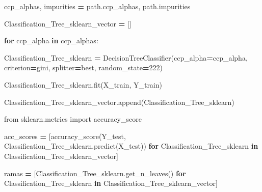 \documentclass[
  11pt,
  a4paper,
]{article}
\newenvironment{Shaded}{\begin{snugshade}}{\end{snugshade}}
\newcommand{\ControlFlowTok}[1]{\textcolor[rgb]{0.13,0.29,0.53}{\textbf{#1}}}
\newcommand{\DecValTok}[1]{\textcolor[rgb]{0.00,0.00,0.81}{#1}}
\newcommand{\ImportTok}[1]{#1}
\newcommand{\KeywordTok}[1]{\textcolor[rgb]{0.13,0.29,0.53}{\textbf{#1}}}
\newcommand{\NormalTok}[1]{#1}
\newcommand{\OperatorTok}[1]{\textcolor[rgb]{0.81,0.36,0.00}{\textbf{#1}}}
\newcommand{\StringTok}[1]{\textcolor[rgb]{0.31,0.60,0.02}{#1}}
\begin{document}
\begin{Shaded}
\begin{Highlighting}[]
\NormalTok{ccp\_alphas, impurities }\OperatorTok{=}\NormalTok{ path.ccp\_alphas, path.impurities}
\end{Highlighting}
\end{Shaded}

\begin{Shaded}
\begin{Highlighting}[]
\NormalTok{Classification\_Tree\_sklearn\_vector }\OperatorTok{=}\NormalTok{ []}

\ControlFlowTok{for}\NormalTok{ ccp\_alpha }\KeywordTok{in}\NormalTok{ ccp\_alphas:}
    
\NormalTok{    Classification\_Tree\_sklearn }\OperatorTok{=}\NormalTok{ DecisionTreeClassifier(ccp\_alpha}\OperatorTok{=}\NormalTok{ccp\_alpha, criterion}\OperatorTok{=}\StringTok{\textquotesingle{}gini\textquotesingle{}}\NormalTok{, splitter}\OperatorTok{=}\StringTok{\textquotesingle{}best\textquotesingle{}}\NormalTok{, random\_state}\OperatorTok{=}\DecValTok{222}\NormalTok{)}
    
\NormalTok{    Classification\_Tree\_sklearn.fit(X\_train, Y\_train)}

\NormalTok{    Classification\_Tree\_sklearn\_vector.append(Classification\_Tree\_sklearn)}
\end{Highlighting}
\end{Shaded}

\begin{Shaded}
\begin{Highlighting}[]
\ImportTok{from}\NormalTok{ sklearn.metrics }\ImportTok{import}\NormalTok{ accuracy\_score}
\end{Highlighting}
\end{Shaded}

\begin{Shaded}
\begin{Highlighting}[]
\NormalTok{acc\_scores }\OperatorTok{=}\NormalTok{ [accuracy\_score(Y\_test, Classification\_Tree\_sklearn.predict(X\_test)) }\ControlFlowTok{for}\NormalTok{ Classification\_Tree\_sklearn }\KeywordTok{in}\NormalTok{ Classification\_Tree\_sklearn\_vector]}

\NormalTok{ramas }\OperatorTok{=}\NormalTok{ [Classification\_Tree\_sklearn.get\_n\_leaves() }\ControlFlowTok{for}\NormalTok{ Classification\_Tree\_sklearn }\KeywordTok{in}\NormalTok{ Classification\_Tree\_sklearn\_vector]}
\end{Highlighting}
\end{Shaded}
\end{document}
